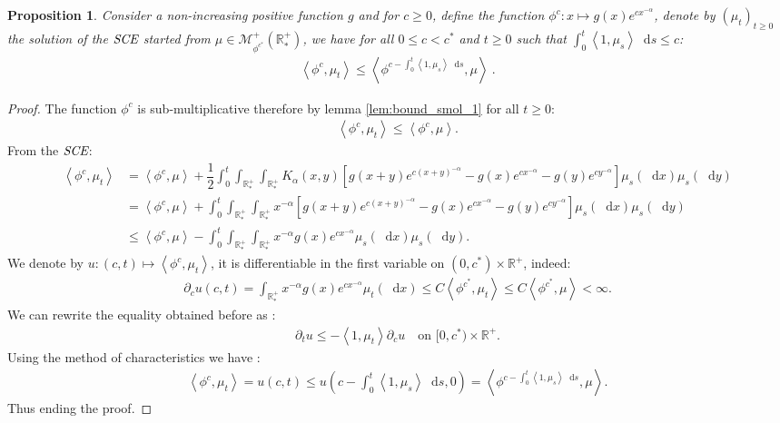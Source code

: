 \documentclass[11pt,a4paper]{article}
\newcommand{\RR}{\mathbb{R}}
\newcommand{\RRP}{\mathbb{R}^+_*}
\newcommand{\MC}{\mathcal{M}}
\newcommand{\SCE}{\emph{SCE}}
\newcommand{\Proc}[1]{\left(#1\right)_{t\geq 0}}
\newcommand{\brac}[1]{\left\langle#1\right\rangle}
\newcommand{\dd}{\mathop{}\!\mathrm{d}}
\newtheorem{proposition}[theorem]{Proposition}
\begin{document}
\begin{proposition}\label{prop:bound_smol_exponential}
    Consider a non-increasing positive function $g$ and for $c \geq 0$, define the function $\phi^c : x \mapsto g(x)e^{cx^{-\alpha}}$, denote by $\Proc{\mu_t}$ the solution of the $\SCE$ started from $\mu \in \MC_{\phi^{c^*}}^+(\RRP)$, we have for all $0 \leq c  < c^*$ and $t \geq 0$ such that $\int_0^t\brac{1,\mu_s}\dd s \leq c$:
    \begin{align*}
        \brac{\phi^{c},\mu_t} \leq \brac{\phi^{c -\int_0^t\brac{1,\mu_s}\dd s} ,\mu}\ .
    \end{align*}
\end{proposition}
\begin{proof}
    The function $\phi^c$ is sub-multiplicative therefore by lemma \ref{lem:bound_smol_1} for all $t \geq 0$:
    \begin{align*}
        \brac{\phi^{c},\mu_t} \leq \brac{\phi^c,\mu}.
    \end{align*}
    From the $\SCE$:
    \begin{align*}
        \brac{\phi^{c},\mu_t} &= \brac{\phi^c,\mu} + \dfrac12\int_0^t \int_{\RRP} \int_{\RRP} K_\alpha(x,y)\left[ g(x+y)e^{c(x+y)^{-\alpha}} - g(x)e^{cx^{-\alpha}}- g(y)e^{cy^{-\alpha}}\right] \mu_s(\dd x)\mu_s(\dd y) \\
        &= \brac{\phi^c,\mu} + \int_0^t \int_{\RRP} \int_{\RRP} x^{-\alpha}\left[ g(x+y)e^{c(x+y)^{-\alpha}} - g(x)e^{cx^{-\alpha}}- g(y)e^{cy^{-\alpha}}\right] \mu_s(\dd x)\mu_s(\dd y)\\
        &\leq \brac{\phi^c,\mu} - \int_0^t \int_{\RRP} \int_{\RRP} x^{-\alpha}g(x)e^{cx^{-\alpha}} \mu_s(\dd x)\mu_s(\dd y).
    \end{align*}
    We denote by $u : (c,t) \mapsto \brac{\phi^c,\mu_t}$, it is differentiable in the first variable on $(0,c^*)\times \RR^+$, indeed:
    \begin{align*}
        \partial_c u(c,t) = \int_{\RRP} x^{-\alpha} g(x)e^{cx^{-\alpha}} \mu_t(\dd x) \leq C \brac{\phi^{c^*},\mu_t} \leq C \brac{\phi^{c^*},\mu} < \infty.
    \end{align*}
    We can rewrite the equality obtained before as :
    \begin{align*}
        \partial_t u \leq -\brac{1,\mu_t}\partial_cu \quad\text{on } [0,c^*)\times \RR^+.
    \end{align*}
    Using the method of characteristics we have :
    \begin{align*}
        \brac{\phi^c,\mu_t} = u(c,t) \leq u\left(c - \int_0^t \brac{1,\mu_s}\dd s ,0\right) = \brac{\phi^{c -\int_0^t\brac{1,\mu_s}\dd s} ,\mu}.
    \end{align*}
    Thus ending the proof.
\end{proof}
\end{document}
